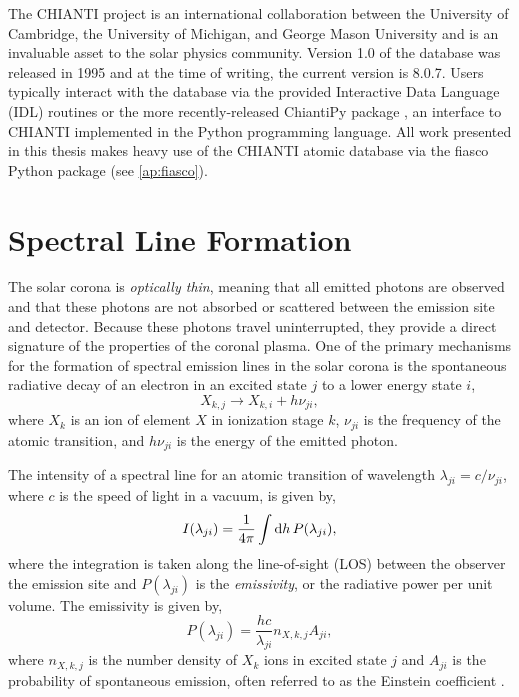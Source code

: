 The CHIANTI project is an international collaboration between the University of Cambridge, the University of Michigan, and George Mason University and is an invaluable asset to the solar physics community. Version 1.0 of the database was released in 1995 and at the time of writing, the current version is 8.0.7. Users typically interact with the database via the provided Interactive Data Language (IDL) routines or the more recently-released ChiantiPy package \citep{landi_chiantiatomic_2012,barnes_chiantipy_2017}, an interface to CHIANTI implemented in the Python programming language. All work presented in this thesis makes heavy use of the CHIANTI atomic database via the fiasco Python package (see \autoref{ap:fiasco}).

\section{Spectral Line Formation}\label{sec:line_formation}

The solar corona is \textit{optically thin}, meaning that all emitted photons are observed and that these photons are not absorbed or scattered between the emission site and detector. Because these photons travel uninterrupted, they provide a direct signature of the properties of the coronal plasma. One of the primary mechanisms for the formation of spectral emission lines in the solar corona is the spontaneous radiative decay of an electron in an excited state $j$ to a lower energy state $i$,
\begin{equation}\label{eq:radiative_decay}
    X_{k,j} \to X_{k,i} + h\nu_{ji},
\end{equation}
where $X_k$ is an ion of element $X$ in ionization stage $k$, $\nu_{ji}$ is the frequency of the atomic transition, and $h\nu_{ji}$ is the energy of the emitted photon.

The intensity of a spectral line for an atomic transition of wavelength $\lambda_{ji}=c/\nu_{ji}$, where $c$ is the speed of light in a vacuum, is given by,
\begin{equation}\label{eq:intensity}
    I(\lambda_{ji}) = \frac{1}{4\pi}\int\textup{d}h\,P(\lambda_{ji}),
\end{equation}
where the integration is taken along the line-of-sight (LOS) between the observer the emission site and $P(\lambda_{ji})$ is the \textit{emissivity}, or the radiative power per unit volume. The emissivity is given by,
\begin{equation}\label{eq:emissivity}
    P(\lambda_{ji}) = \frac{hc}{\lambda_{ji}}n_{X,k,j}A_{ji},
\end{equation}
where $n_{X,k,j}$ is the number density of $X_k$ ions in excited state $j$ and $A_{ji}$ is the probability of spontaneous emission, often referred to as the Einstein coefficient \citep{bradshaw_collisional_2013,del_zanna_solar_2018}.

